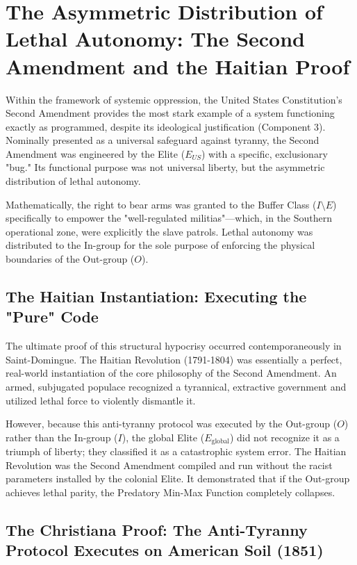 \documentclass[12pt,openany]{book}
\begin{document}
\section{The Asymmetric Distribution of Lethal Autonomy: The Second Amendment and the Haitian Proof}

Within the framework of systemic oppression, the United States Constitution’s Second Amendment provides the most stark example of a system functioning exactly as programmed, despite its ideological justification (Component 3). Nominally presented as a universal safeguard against tyranny, the Second Amendment was engineered by the Elite ($E_{US}$) with a specific, exclusionary "bug." Its functional purpose was not universal liberty, but the asymmetric distribution of lethal autonomy.

Mathematically, the right to bear arms was granted to the Buffer Class ($I \setminus E$) specifically to empower the "well-regulated militias"—which, in the Southern operational zone, were explicitly the slave patrols. Lethal autonomy was distributed to the In-group for the sole purpose of enforcing the physical boundaries of the Out-group ($O$).

\subsection{The Haitian Instantiation: Executing the "Pure" Code}
The ultimate proof of this structural hypocrisy occurred contemporaneously in Saint-Domingue. The Haitian Revolution (1791-1804) was essentially a perfect, real-world instantiation of the core philosophy of the Second Amendment. An armed, subjugated populace recognized a tyrannical, extractive government and utilized lethal force to violently dismantle it.

However, because this anti-tyranny protocol was executed by the Out-group ($O$) rather than the In-group ($I$), the global Elite ($E_{\text{global}}$) did not recognize it as a triumph of liberty; they classified it as a catastrophic system error. The Haitian Revolution was the Second Amendment compiled and run without the racist parameters installed by the colonial Elite. It demonstrated that if the Out-group achieves lethal parity, the Predatory Min-Max Function completely collapses.

\subsection{The Christiana Proof: The Anti-Tyranny Protocol Executes on American Soil (1851)}
\end{document}
